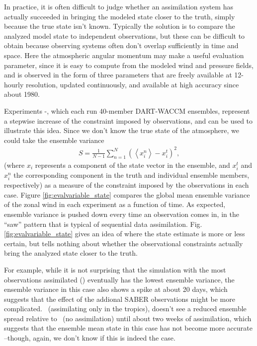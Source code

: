 In practice, it is often difficult to judge whether an assimilation system has actually succeeded in bringing the modeled state closer to the truth, simply because the true state isn't known. 
Typically the solution is to compare the analyzed model state to independent observations, but these can be difficult to obtain because observing systems often don't overlap sufficiently in time and space.
Here the atmospheric angular momentum may make a useful evaluation parameter, since it is easy to compute from the modeled wind and pressure fields, and is observed in the form of three parameters that are freely available at 12-hourly resolution, updated continuously, and available at high accuracy since about 1980.  

Experiments \WACCMNODA-\NCARFULL, which each run 40-member DART-WACCM ensembles, 
represent a stepwise increase of the constraint imposed by observations, and can be used to illustrate this idea.
Since we don't know the true state of the atmosphere, we could take the ensemble variance 
\begin{eqnarray}
S = 
\frac{1}{N-1}
\sum_{n=1}^N
\left(
	\left< x_{i}^{n} \right>-x_i^t
\right)^2,
\label{eq:spread}
\end{eqnarray}
(where $x_{i}$ represents a component of the state vector in the ensemble,  and $x_{i}^t$ and $x_{i}^n$ the corresponding component in the truth and individual ensemble members, respectively) as a measure of the constraint imposed by the observations in each case. 
Figure \ref{fig:evalvariable_state} compares 
the global mean ensemble variance of the zonal wind in each experiment as a function of time.  
As expected, ensemble variance is pushed down every time an observation comes in, in the ``saw'' pattern that is typical of sequential data assimilation. 
Fig.  \ref{fig:evalvariable_state} gives an idea of where the state estimate is more or less certain, but tells nothing about whether the observational constraints actually bring the analyzed state closer to the truth. 

For example, while it is not surprising that the simulation with the most observations assimilated (\NCARFULL) eventually has the lowest ensemble variance, the ensemble variance in this case also shows a spike at about 20 days, which suggests that the effect of the addional SABER observations might be more complicated. 
\WACCMTROPICS~(assimilating only in the tropics), doesn't see a reduced ensemble spread relative to \NODA~(no assimilation) until about two weeks of assimilation, which suggests that the ensemble mean state in this case has not become more accurate --though, again, we don't know if this is indeed the case.  


